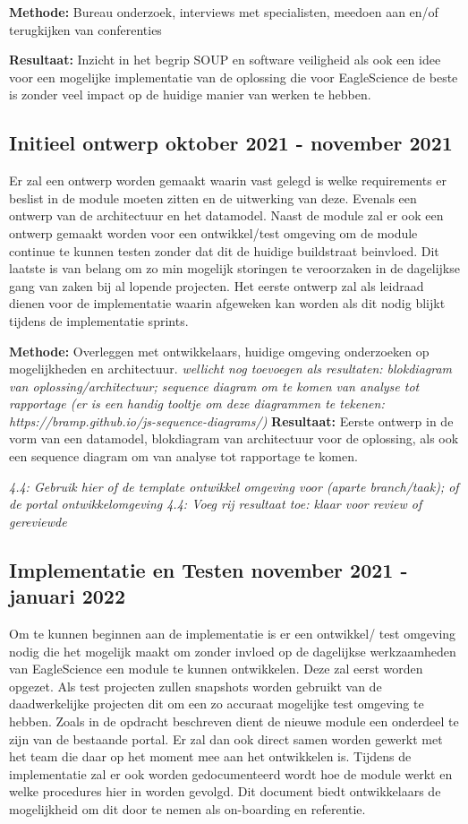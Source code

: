 \textbf{Methode:} Bureau onderzoek, interviews met specialisten, meedoen aan en/of terugkijken van conferenties

\textbf{Resultaat:} Inzicht in het begrip SOUP en software veiligheid als ook een idee voor een mogelijke implementatie van de oplossing die voor EagleScience de beste is zonder veel impact op de huidige manier van werken te hebben.

\subsection{Initieel ontwerp \textbf{oktober 2021 - november 2021 }}\label{subsec:initieel-ontwerp}
Er zal een ontwerp worden gemaakt waarin vast gelegd is welke requirements er beslist in de module moeten zitten en de uitwerking van deze. Evenals een ontwerp van de architectuur en het datamodel. Naast de module zal er ook een ontwerp gemaakt worden voor een ontwikkel/test omgeving om de module continue te kunnen testen zonder dat dit de huidige buildstraat beinvloed. Dit laatste is van belang om zo min mogelijk storingen te veroorzaken in de dagelijkse gang van zaken bij al lopende projecten. Het eerste ontwerp zal als leidraad dienen voor de implementatie waarin afgeweken kan worden als dit nodig blijkt tijdens de implementatie sprints.

\textbf{Methode:} Overleggen met ontwikkelaars, huidige omgeving onderzoeken op mogelijkheden en architectuur.
\textit{wellicht nog toevoegen als resultaten: blokdiagram van oplossing/architectuur; sequence diagram om te komen van analyse tot rapportage (er is een handig tooltje om deze diagrammen te tekenen: https://bramp.github.io/js-sequence-diagrams/)}
\textbf{Resultaat:} Eerste ontwerp in de vorm van een datamodel, blokdiagram van architectuur voor de oplossing, als ook een sequence diagram om van analyse tot rapportage te komen.

\textit{4.4: Gebruik hier of de template ontwikkel omgeving voor (aparte branch/taak); of de portal ontwikkelomgeving
4.4: Voeg rij resultaat toe: klaar voor review of gereviewde}

\subsection{Implementatie en Testen \textbf{november 2021 - januari 2022 }}\label{subsec:implementatie-en-testen}
Om te kunnen beginnen aan de implementatie is er een ontwikkel/ test omgeving nodig die het mogelijk maakt om zonder invloed op de dagelijkse werkzaamheden van EagleScience een module te kunnen ontwikkelen. Deze zal eerst worden opgezet. Als test projecten zullen snapshots worden gebruikt van de daadwerkelijke projecten dit om een zo accuraat mogelijke test omgeving te hebben. Zoals in de opdracht beschreven dient de nieuwe module een onderdeel te zijn van de bestaande portal. Er zal dan ook direct samen worden gewerkt met het team die daar op het moment mee aan het ontwikkelen is. Tijdens de implementatie zal er ook worden gedocumenteerd wordt hoe de module werkt en welke procedures hier in worden gevolgd. Dit document biedt ontwikkelaars de mogelijkheid om dit door te nemen als on-boarding en referentie.

